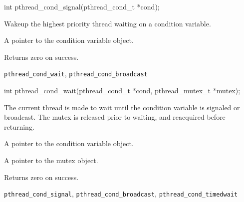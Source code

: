\begin{apisyn}

	\funcproto int pthread_cond_signal(pthread_cond_t *cond);
\end{apisyn}
\begin{apidesc}
	Wakeup the highest priority thread waiting on a condition variable.
\end{apidesc}
\begin{apiparm}
	\item[cond]
		A pointer to the condition variable object.
\end{apiparm}
\begin{apiret}
	Returns zero on success.
\end{apiret}
\begin{apirel}
	{\tt pthread_cond_wait}, {\tt pthread_cond_broadcast}
\end{apirel}


\begin{apisyn}

	\funcproto int pthread_cond_wait(pthread_cond_t *cond,
					 pthread_mutex_t *mutex);
\end{apisyn}
\begin{apidesc}
	The current thread is made to wait until the condition variable is
	signaled or broadcast. The mutex is released prior to waiting, and
	reacquired before returning. 
\end{apidesc}
\begin{apiparm}
	\item[cond]
		A pointer to the condition variable object.
	\item[mutex]
		A pointer to the mutex object.
\end{apiparm}
\begin{apiret}
	Returns zero on success.
\end{apiret}
\begin{apirel}
	{\tt pthread_cond_signal}, {\tt pthread_cond_broadcast},
	{\tt pthread_cond_timedwait}
\end{apirel}



